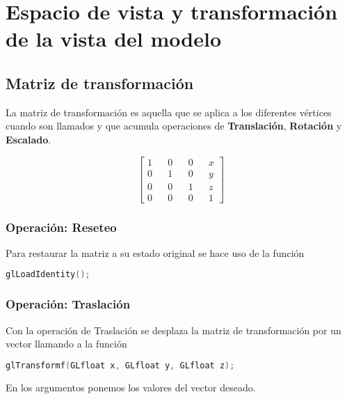 \chapter{Espacio de vista y transformación de la vista del modelo}
\section{Matriz de transformación}
La matriz de transformación es aquella que se aplica a los diferentes vértices cuando son llamados y que acumula operaciones de \textbf{Translación}, \textbf{Rotación} y \textbf{Escalado}.
 \begin{figure}[ht]
   \centering
   \[
  \begin{bmatrix}
    1 && 0 && 0 && x\\
    0 && 1 && 0 && y\\
    0 && 0 && 1 && z\\
    0 && 0 && 0 && 1
  \end{bmatrix}
  \]
 \end{figure}
 \subsection{Operación: Reseteo}
Para restaurar la matriz a su estado original se hace uso de la función
\begin{lstlisting}[language=C]
  glLoadIdentity();
\end{lstlisting}
\subsection{Operación: Traslación}
Con la operación de Traslación se desplaza la matriz de transformación por un vector llamando a la función
\begin{lstlisting}[language=C]
  glTransformf(GLfloat x, GLfloat y, GLfloat z);
\end{lstlisting}
En los argumentos ponemos los valores del vector deseado.
